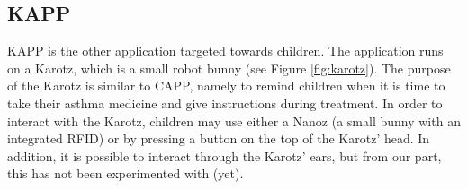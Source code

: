 \subsection{KAPP}
KAPP is the other application targeted towards children. The application runs on a Karotz\cite{karotz}, which is a small robot bunny (see Figure \ref{fig:karotz}). The purpose of the Karotz is similar to CAPP, namely to remind children when it is time to take their asthma medicine and give instructions during treatment. In order to interact with the Karotz, children may use either a Nanoz (a small bunny with an integrated RFID) or by pressing a button on the top of the Karotz' head. In addition, it is possible to interact through the Karotz' ears, but from our part, this has not been experimented with (yet).     




